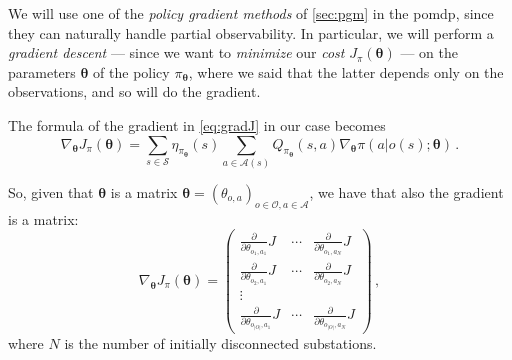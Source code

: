 We will use one of the \emph{policy gradient methods} of \autoref{sec:pgm} in the \acrshort{pomdp}, since they can naturally handle partial observability. In particular, we will perform a \emph{gradient descent} --- since we want to \textit{minimize} our \textit{cost} $J_\pi(\boldsymbol \theta)$ --- on the parameters $\boldsymbol \theta$ of the policy $\pi_{\boldsymbol \theta}$, where we said that the latter depends only on the observations, and so will do the gradient.

The formula of the gradient in \eqref{eq:gradJ} in our case becomes
\begin{equation}
    \nabla_{\boldsymbol \theta} J_\pi (\boldsymbol \theta) = \sum_{s \in \mathcal S} \eta_{\pi_{\boldsymbol \theta}}(s) \sum_{a \in \mathcal A(s)} Q_{\pi_{\boldsymbol \theta}}(s,a) \nabla_{\boldsymbol \theta} \pi(a|o(s); \boldsymbol \theta) \, .
    \label{eq:mygradJ_oneline}
\end{equation}

So, given that $\boldsymbol \theta$ is a matrix $\boldsymbol \theta = (\theta_{o,a})_{o \in \mathcal O, a \in \mathcal A}$, we have that also the gradient is a matrix:
\begin{equation}
    \nabla_{\boldsymbol \theta} J_\pi (\boldsymbol \theta) = \begin{pmatrix}
        \frac{\partial}{\partial \theta_{o_1, a_1}} J & \cdots & \frac{\partial}{\partial \theta_{o_1, a_N}} J \\
        \frac{\partial}{\partial \theta_{o_2, a_1}} J &  \cdots & \frac{\partial}{\partial \theta_{o_2, a_N}} J \\
        \vdots \\
        \frac{\partial}{\partial \theta_{o_{|O|}, a_1}} J & \cdots & \frac{\partial}{\partial \theta_{o_{|O|}, a_N}} J
    \end{pmatrix} \, ,
\end{equation}
where $N$ is the number of initially disconnected substations.

